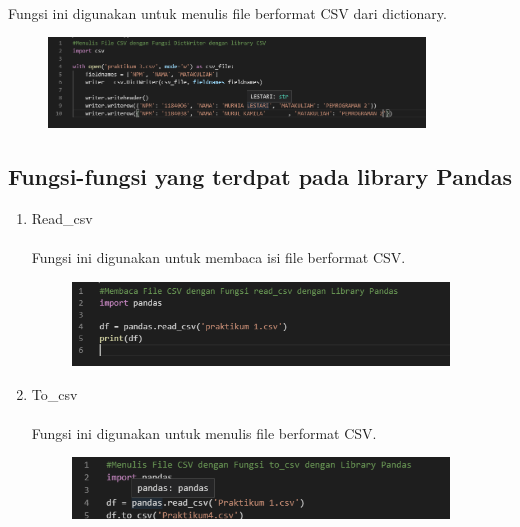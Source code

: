 \documentclass{article}
\begin{document}
\begin{enumerate}
                \paragraph{}  Fungsi ini digunakan untuk menulis file berformat CSV dari dictionary.
              \begin{figure}[ht]
                \centerline{\includegraphics[width=10cm]{figure/6.PNG}}
            \end{figure}
        \end{enumerate}
     
    \subsection{Fungsi-fungsi yang terdpat pada library Pandas}
        \begin{enumerate}
            \item Read\_csv
                \paragraph{} Fungsi ini digunakan untuk membaca isi file berformat CSV.
                \begin{figure}[ht]
                \centerline{\includegraphics[width=10cm]{figure/7.PNG}}
            \end{figure}
            \item To\_csv
                \paragraph{} Fungsi ini digunakan untuk menulis file berformat CSV.
               \begin{figure}[ht]
                \centerline{\includegraphics[width=10cm]{figure/8.PNG}}
            \end{figure}
        \end{enumerate}
    
\end{document}
